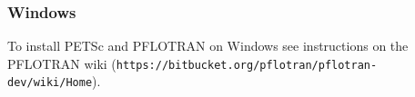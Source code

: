 \subsubsection{Windows}

To install PETSc and PFLOTRAN on Windows see instructions on the PFLOTRAN wiki \linebreak ({\tt https://bitbucket.org/pflotran/pflotran-dev/wiki/Home}).

\begin{comment}
\subsubsection{MacOSX}

\begin{verbatim}
./config/configure.py \
--with-mpi-dir=$MPI_HOME \
--download-openmpi=1 \
--with-debugging=0 \
--with-shared-libraries=0 \
--download-mumps=1 \
--download-parmetis=1 \
--download-scalapack=1 \
--download-blacs=1 \
--download-ml=1 \
--download-hdf5=1 

make all
make test
\end{verbatim}

\begin{enumerate}
\item Obtain C compiler gcc4.5 or later for snow leopard (e.g. from http://hpc.sourceforge.net). 
Install gcc under \verb|/opt/local| or \verb|/usr/local|. 
You don't have to get gcc4.5 or 4.6,
but you have to have a verison not older than gcc4.3 for some features in
pflotran. Both gcc4.5 and gcc4.6 come with gfortran.

\item Install openmpi 1.5.1 from www.open-mpi.org. Configure using the command:

\begin{verbatim}
./configure CC=gcc CXX=g++ FC=gfortran --enable-mpi-f77=no 
--prefix=/opt/local
\end{verbatim}

\item Download petsc-dev and configure using

\begin{verbatim}
./configure --download-hdf5=1 --with-cc=mpicc --with-cxx=mpicxx 
--with-fc=mpif90,
\end{verbatim}

then compile with \verb|make all|.

\item Compile pflotran using

\verb|make pflotran|
\end{enumerate}
\end{comment}

